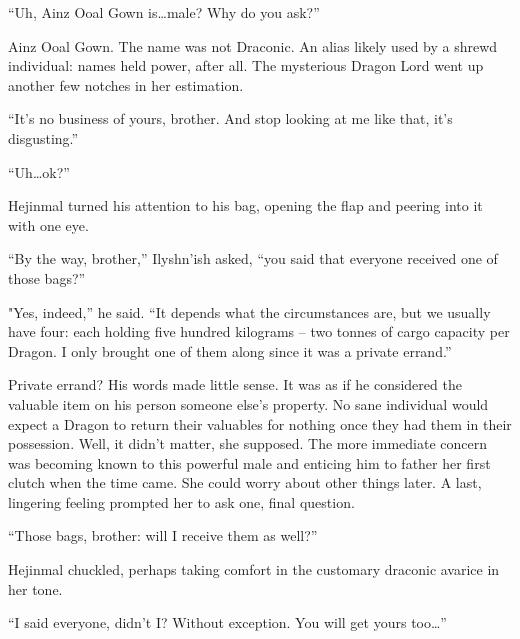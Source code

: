  

“Uh, Ainz Ooal Gown is…male? Why do you ask?”

 

Ainz Ooal Gown. The name was not Draconic. An alias likely used by a shrewd individual: names held power, after all. The mysterious Dragon Lord went up another few notches in her estimation.

 

“It’s no business of yours, brother. And stop looking at me like that, it’s disgusting.”

 

“Uh…ok?”

 

Hejinmal turned his attention to his bag, opening the flap and peering into it with one eye.

 

“By the way, brother,” Ilyshn’ish asked, “you said that everyone received one of those bags?”

 

"Yes, indeed,” he said. “It depends what the circumstances are, but we usually have four: each holding five hundred kilograms – two tonnes of cargo capacity per Dragon. I only brought one of them along since it was a private errand.”

 

Private errand? His words made little sense. It was as if he considered the valuable item on his person someone else’s property. No sane individual would expect a Dragon to return their valuables for nothing once they had them in their possession. Well, it didn’t matter, she supposed. The more immediate concern was becoming known to this powerful male and enticing him to father her first clutch when the time came. She could worry about other things later. A last, lingering feeling prompted her to ask one, final question.

 

“Those bags, brother: will I receive them as well?”

 

Hejinmal chuckled, perhaps taking comfort in the customary draconic avarice in her tone.

 

“I said everyone, didn’t I? Without exception. You will get yours too…”